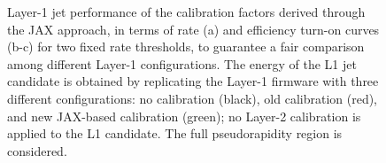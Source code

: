 \begin{figure}
    \centering
    
    \caption{Layer-1 jet performance of the calibration factors derived through the JAX approach, in terms of rate (a) and efficiency turn-on curves (b-c) for two fixed rate thresholds, to guarantee a fair comparison among different Layer-1 configurations. The energy of the L1 jet candidate is obtained by replicating the Layer-1 firmware with three different configurations: no calibration (black), old calibration (red), and new JAX-based calibration (green); no Layer-2 calibration is applied to the L1 candidate. The full pseudorapidity region is considered.}
    \label{fig:JAX_HCAL_TurnOn}
\end{figure}

